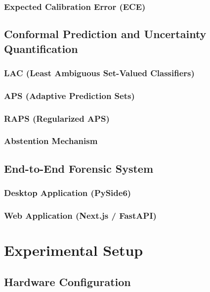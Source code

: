 \subsection{Expected Calibration Error (ECE)}

\section{Conformal Prediction and Uncertainty Quantification}\label{sec:conformal}
\subsection{LAC (Least Ambiguous Set-Valued Classifiers)}
\subsection{APS (Adaptive Prediction Sets)}
\subsection{RAPS (Regularized APS)}
\subsection{Abstention Mechanism}

\section{End-to-End Forensic System}\label{sec:system}
\subsection{Desktop Application (PySide6)}
\subsection{Web Application (Next.js / FastAPI)}



\chapter{Experimental Setup}\label{chap:setup}

\section{Hardware Configuration}\label{sec:hardware}

